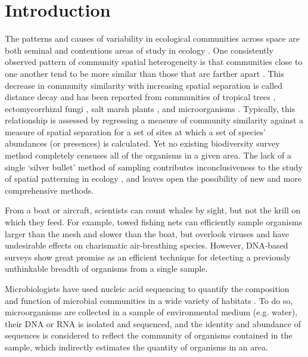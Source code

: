 \documentclass[11pt,letterpaper]{article} %
\begin{document}
\section*{Introduction}

The patterns and causes of variability in ecological communities across space are both seminal and contentious areas of study in ecology \citep{Hubbell2001, Anderson2011}. One consistently observed pattern of community spatial heterogeneity is that communities close to one another tend to be more similar than those that are farther apart \citep{Nekola1999}. This decrease in community similarity with increasing spatial separation is called distance decay and has been reported from communities of tropical trees \citep{Condit2002, Chust2006}, ectomycorrhizal fungi \citep{Bahram2013}, salt marsh plants \citep{Guo2015}, and microorganisms \citep{Martiny2011, Chust2013, Wetzel2012, Bell2010}. Typically, this relationship is assessed by regressing a measure of community similarity against a measure of spatial separation for a set of sites at which a set of species' abundances (or presences) is calculated. Yet no existing biodiversity survey method completely censuses all of the organisms in a given area. The lack of a single `silver bullet' method of sampling contributes inconclusiveness to the study of spatial patterning in ecology \citep{Levin1992}, and leaves open the possibility of new and more comprehensive methods.

From a boat or aircraft, scientists can count whales by sight, but not the krill on which they feed. For example, towed fishing nets can efficiently sample organisms larger than the mesh and slower than the boat, but overlook viruses and have undesirable effects on charismatic air-breathing species. However, DNA-based surveys show great promise as an efficient technique for detecting a previously unthinkable breadth of organisms from a single sample.


Microbiologists have used nucleic acid sequencing to quantify the composition and function of microbial communities in a wide variety of habitats \citep{Handelsman1998, Tyson2004, Venter2004, Iverson2012}. To do so, microorganisms are collected in a sample of environmental medium (e.g. water), their DNA or RNA is isolated and sequenced, and the identity and abundance of sequences is considered to reflect the community of  organisms contained in the sample, which indirectly estimates the quantity of organisms in an area.
\end{document}
